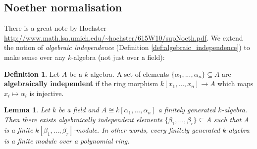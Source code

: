 \documentclass[12pt]{article}
\theoremstyle{plain}
\newtheorem{lemma}[thm]{Lemma}
\theoremstyle{definition}
\newtheorem{defn}[thm]{Definition} %
\newcommand{\lto}{\longrightarrow}
\begin{document}
	\subsection{Noether normalisation}
	There is a great note by Hochster \url{http://www.math.lsa.umich.edu/~hochster/615W10/supNoeth.pdf}.
	We extend the notion of \emph{algebraic independence} (Definition \ref{def:algebraic_independence}) to make sense over any $k$-algebra (not just over a field):
	\begin{defn}
		Let $A$ be a $k$-algebra. A set of elements $\lbrace \alpha_1,...,\alpha_n \rbrace \subseteq A$ are \textbf{algebraically independent} if the ring morphism $k[x_1,...,x_n] \lto A$ which maps $x_i \mapsto \alpha_i$ is injective.
	\end{defn}
	\begin{lemma}
		\label{lem:noether_normalisation}
		Let $k$ be a field and $A\cong k[\alpha_1,...,\alpha_n]$ a finitely generated $k$-algebra. Then there exists algebraically independent elements $\lbrace \beta_1,...,\beta_r\rbrace \subseteq A$ such that $A$ is a finite $k[\beta_1,...,\beta_r]$-module. In other words, every finitely generated $k$-algebra is a finite module over a polynomial ring.
	\end{lemma}
\end{document}
